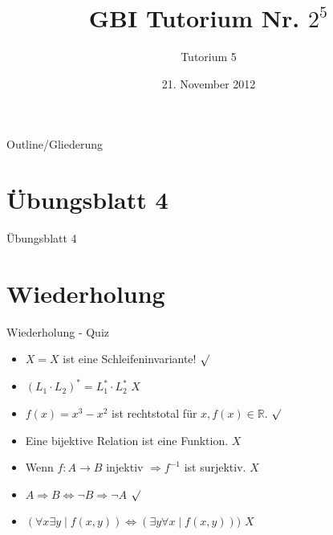 

\title[Tutorium 5]{GBI Tutorium Nr. $2^5$}
\subtitle{Tutorium 5}
\date{21. November 2012}






	\begin{frame}
		\titlepage
	\end{frame}

	\begin{frame}{Outline/Gliederung}
		\tableofcontents
	\end{frame}
	
	
	\section{\"Ubungsblatt 4}
	\begin{frame} {Übungsblatt 4}
		
	\end{frame}	
		
	
	
	
	\section{Wiederholung} 
	\begin{frame} {Wiederholung - Quiz}
		\begin{itemize}
			\item $X=X$ ist eine Schleifeninvariante! 
			\only<2-> {\color{darkgreen}$\surd$}\\
			\color{black}
			\item $(L_1 \cdot L_2)^* = L_1^* \cdot L_2^*$
			\only<3-> {\color{red}$X$}\\
			\color{black}
			\item $f(x) = x^3-x^2$ ist rechtstotal für $x, f(x) \in \mathbb{R}$.
			\only<4-> {\color{darkgreen}$\surd$}\\
			\color{black}
			\item Eine bijektive Relation ist eine Funktion.
			\only<5-> {\color{red}$X$}\\
			\color{black}
			\item Wenn $f: A \rightarrow B$ injektiv $\Rightarrow f^{-1}$ ist surjektiv.
			\only<6-> {\color{red}$X$}\\
			\color{black}
			\item $A\Rightarrow B \Leftrightarrow \neg B \Rightarrow \neg A$
			\only<7-> {\color{darkgreen}$\surd$}\\
			\color{black}
			\item $(\forall x \exists y \; | \; f(x,y)) \Leftrightarrow (\exists y \forall x \; | \; f(x,y)))$
			\only<8-> {\color{red}$X$}\\
		\end{itemize}
	\end{frame}
	
